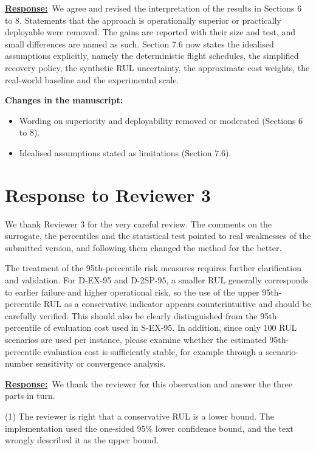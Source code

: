 \documentclass{article}
\newcommand{\response}{\vspace{0.1cm}\noindent\underline{\textbf{Response:}}\ }
\newcommand{\changes}{\vspace{0.1cm}\noindent\textbf{Changes in the manuscript:}}
\begin{document}
\response We agree and revised the interpretation of the results in Sections 6 to 8. Statements that the approach is operationally superior or practically deployable were removed. The gains are reported with their size and test, and small differences are named as such. Section 7.6 now states the idealised assumptions explicitly, namely the deterministic flight schedules, the simplified recovery policy, the synthetic RUL uncertainty, the approximate cost weights, the real-world baseline and the experimental scale.

\changes
\begin{itemize}[nosep]
\item Wording on superiority and deployability removed or moderated (Sections 6 to 8).
\item Idealised assumptions stated as limitations (Section 7.6).
\end{itemize}



\newpage
\section{Response to Reviewer 3}

We thank Reviewer 3 for the very careful review. The comments on the surrogate, the percentiles and the statistical test pointed to real weaknesses of the submitted version, and following them changed the method for the better.

\begin{cmt}{}{}
The treatment of the 95th-percentile risk measures requires further clarification and validation. For D-EX-95 and D-2SP-95, a smaller RUL generally corresponds to earlier failure and higher operational risk, so the use of the upper 95th-percentile RUL as a conservative indicator appears counterintuitive and should be carefully verified. This should also be clearly distinguished from the 95th percentile of evaluation cost used in S-EX-95. In addition, since only 100 RUL scenarios are used per instance, please examine whether the estimated 95th-percentile evaluation cost is sufficiently stable, for example through a scenario-number sensitivity or convergence analysis.
\end{cmt}

\response We thank the reviewer for this observation and answer the three parts in turn.

(1) The reviewer is right that a conservative RUL is a lower bound. The implementation used the one-sided 95\% lower confidence bound, and the text wrongly described it as the upper bound.
\end{document}
